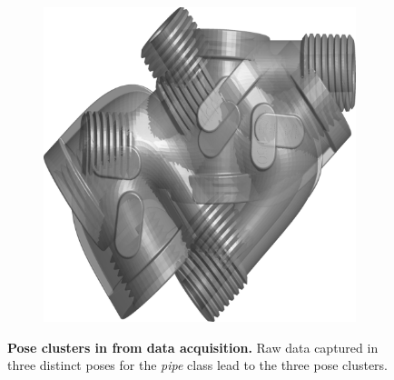 \begin{figure}[ht]
\begin{subfigure}[b]{0.30\linewidth}
		\includegraphics[width=\linewidth]{fig/reg/cluster3.png}
	\end{subfigure}
	\caption{\textbf{Pose clusters in from data acquisition.} Raw data captured in three distinct poses for the \emph{pipe} class lead to the three pose clusters.}
	\label{fig/reg/3dclusters}
\end{figure}

